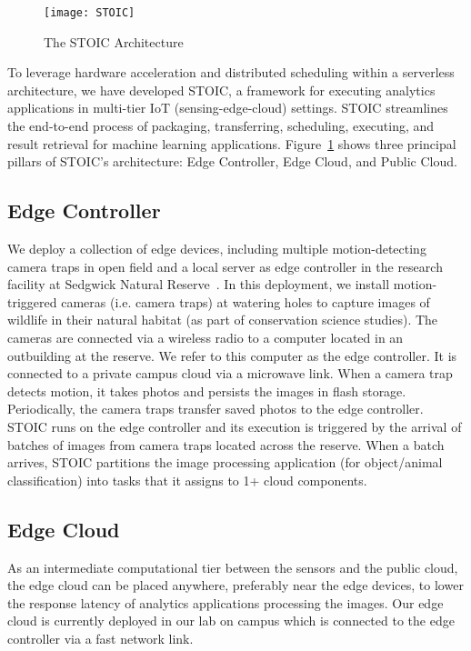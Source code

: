 \begin{figure}
    \centering
    \texttt{[image: STOIC]}
    \caption{The STOIC Architecture \label{fig:STOIC}}
\end{figure}

To leverage hardware acceleration and distributed scheduling within a serverless architecture, we have developed STOIC, a framework for executing analytics applications in multi-tier IoT (sensing-edge-cloud) settings. STOIC streamlines the end-to-end process of packaging, transferring, scheduling, executing, and result retrieval for machine learning applications. Figure~\ref{fig:STOIC} shows three principal pillars of STOIC's architecture: Edge Controller, Edge Cloud, and Public Cloud.

\subsection{Edge Controller}
 We deploy a collection of edge devices, including multiple motion-detecting camera traps in open field and a local server as edge controller in the research facility at Sedgwick Natural Reserve~\cite{ref:sedgwick}. 
In this deployment, we install motion-triggered cameras (i.e. camera traps) at 
watering holes to capture images of wildlife in their natural habitat (as part of conservation science studies). The cameras are connected via a wireless radio to a computer located in an outbuilding at the reserve. We refer to this computer as the edge controller.  It is connected to a private campus cloud via a microwave link. When a camera trap detects motion, it takes photos and persists the images in flash storage. Periodically, the camera traps transfer saved photos to the edge controller. STOIC runs on the edge controller and its execution is triggered by the arrival of batches of images from camera traps located across the reserve. When a batch arrives, STOIC partitions the image processing application (for object/animal classification) into tasks that it assigns to 1+ cloud components.
 
 \subsection{Edge Cloud}
 
As an intermediate computational tier between the sensors and the public cloud, the edge cloud can be placed anywhere, preferably near the edge devices, to lower the response latency of analytics applications processing the images. Our edge cloud is currently deployed in our lab on campus which is connected to the edge controller via a fast network link.


